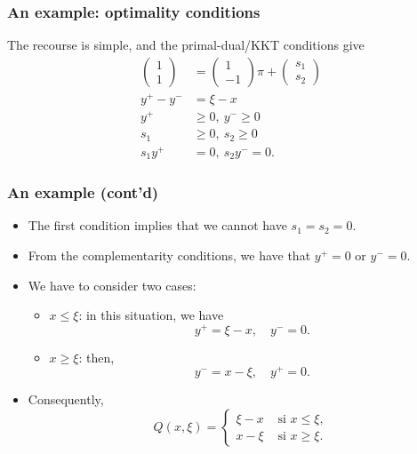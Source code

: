 \documentclass{beamer}
\begin{document}
\begin{frame}
\frametitle{An example: optimality conditions}

The recourse is simple, and the primal-dual/KKT conditions give
\begin{align*}
\begin{pmatrix} 1 \\ 1 \end{pmatrix} & = \begin{pmatrix} 1 \\
  -1 \end{pmatrix} \pi + \begin{pmatrix} s_1 \\ s_2 \end{pmatrix} \\
y^+ - y^- & = \xi - x \\
y^+ &\geq 0,\  y^- \geq 0 \\
s_1 &\geq 0,\ s_2 \geq 0 \\
s_1y^+ & = 0,\ s_2y^- = 0.
\end{align*}

\end{frame}

\begin{frame}
\frametitle{An example (cont'd)}

\begin{itemize}
\item
The first condition implies that we cannot have
$s_1 = s_2 = 0$.
\item
From the complementarity conditions, we have that $y^+ = 0$ or $y^-
= 0$.
\item
We have to consider two cases:
\begin{itemize}
\item
$x \leq \xi$: in this situation, we have
\[
y^+ = \xi -x,\quad y^- = 0.
\]
\item
$x \geq \xi$: then,
\[
y^- = x-\xi,\quad y^+ = 0.
\]
\end{itemize}
\item
Consequently,
\[
Q(x,\xi) = \begin{cases} \xi-x & \mbox{ si } x \leq \xi, \\
x - \xi & \mbox{ si } x \geq \xi. \end{cases}
\]
\end{itemize}

\end{frame}
\end{document}
